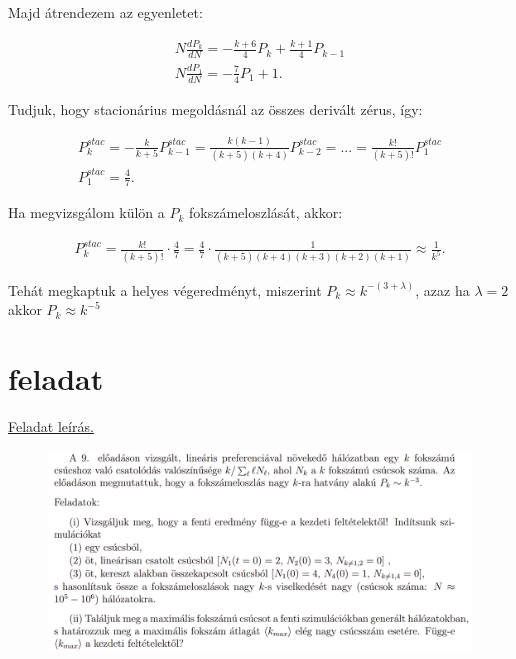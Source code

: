 \documentclass[a4paper, 12pt]{article}
\numberwithin{equation}{section}          %
\numberwithin{figure}{subsection}
\begin{document}
Majd átrendezem az egyenletet:

\begin{center}
	\begin{gather*}
	N\frac{dP_k}{dN} =  - \frac{k + 6}{4}P_k + \frac{k+1}{4}P_{k-1}\\
	N\frac{dP_1}{dN} = - \frac{7}{4}P_1 +1.
	\end{gather*}
\end{center}

Tudjuk, hogy stacionárius megoldásnál az összes derivált zérus, így:
\begin{center}
	\begin{gather*}
	P_k^{stac} =  - \frac{k}{k+5}P_{k-1}^{stac} = \frac{k(k-1)}{(k+5)(k+4)}P_{k-2}^{stac} =... = \frac{k!}{(k+5)!}P_1^{stac}\\
	P_1^{stac} = \frac{4}{7}.
	\end{gather*}
\end{center}

Ha megvizsgálom külön a $P_k$ fokszámeloszlását, akkor:

\begin{center}
	\begin{gather*}
	P_k^{stac} = \frac{k!}{(k+5)!}\cdot \frac{4}{7} = \frac{4}{7} \cdot \frac{1}{(k+5)(k+4)(k+3)(k+2)(k+1)} \approx \frac{1}{k^5}.
	\end{gather*}
\end{center}
Tehát megkaptuk a helyes végeredményt, miszerint $P_k \approx k^{-(3+\lambda)}$, azaz ha $\lambda = 2$ akkor $P_k \approx k^{-5}$
\clearpage
\section{feladat}

\begin{center}
	\underline{Feladat leírás.}
\end{center}

\begin{figure}[h!]%
	\begin{center}
		\includegraphics[width=1\textwidth]{masodikf.png}
	\end{center}
\end{figure}
\end{document}
